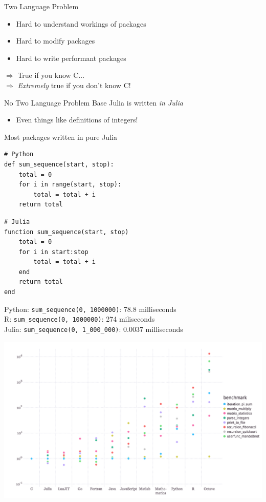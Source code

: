 \documentclass[11pt]{beamer}
\begin{document}
\begin{frame}[c]{Two Language Problem}
\begin{itemize}
    \pause \item Hard to \alert{understand} workings of packages
    \pause \item Hard to \alert{modify} packages
    \pause \item Hard to \alert{write} performant packages
\end{itemize}
\pause
\vspace*{1cm}
$\Rightarrow$ True if you know C... \\
\pause $\Rightarrow$ \emph{Extremely} true if you don't know C!
\end{frame}

\begin{frame}[c]{No Two Language Problem}
Base Julia is written \emph{in Julia}
\begin{itemize}
    \item Even things like definitions of integers!
\end{itemize}
Most packages written in pure Julia
\end{frame}

\begin{frame}[fragile, t]{}
\begin{verbatim}
# Python
def sum_sequence(start, stop):
    total = 0
    for i in range(start, stop):
        total = total + i
    return total
\end{verbatim}
\begin{verbatim}
# Julia
function sum_sequence(start, stop)
    total = 0
    for i in start:stop
        total = total + i
    end
    return total
end
    \end{verbatim}
\pause
Python: \texttt{sum\_sequence(0, 1000000)}: 78.8 milliseconds\\
R: \texttt{sum\_sequence(0, 1000000)}: 274 miliseconds \\
Julia: \texttt{sum\_sequence(0, 1\_000\_000)}: 0.0037 milliseconds
\end{frame}

\begin{frame}[c]{}
    \includegraphics[width=1\textwidth]{figures/benchmarks.png}
\end{frame}
\end{document}
